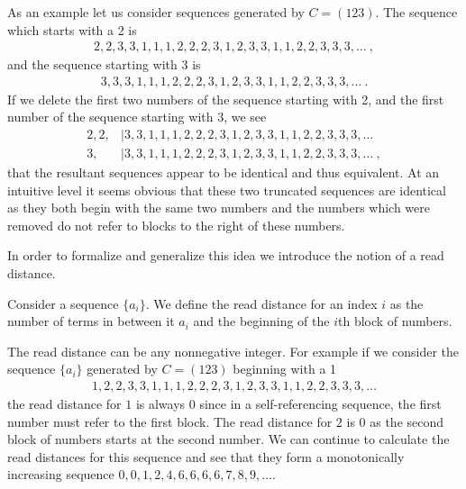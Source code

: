 \documentclass[runningheads,a4paper]{llncs}
\begin{document}
As an example let us consider sequences generated by $C = (123)$. The sequence which starts with a 2 is 
\begin{align*}
2,2,3,3,1,1,1,2,2,2,3,1,2,3,3,1,1,2,2,3,3,3,\dots \ ,
\end{align*}
and the sequence starting with 3 is 
\begin{align*}
3,3,3,1,1,1,2,2,2,3,1,2,3,3,1,1,2,2,3,3,3,\dots \ .
\end{align*}
If we delete the first two numbers of the sequence starting with 2, and the first number of the sequence starting with 3, we see 
\begin{align*}
2,2,&|3,3,1,1,1,2,2,2,3,1,2,3,3,1,1,2,2,3,3,3,\dots\\
3,&|3,3,1,1,1,2,2,2,3,1,2,3,3,1,1,2,2,3,3,3,\dots \ ,
\end{align*}
that the resultant sequences appear to be identical and thus equivalent. At an intuitive level it seems obvious that these two truncated sequences are identical as they both begin with the same two numbers and the numbers which were removed do not refer to blocks to the right of these numbers.   

In order to formalize and generalize this idea we introduce the notion of a read distance.  
\begin{definition} Consider a sequence $\{a_i\}$. We define the read distance for an index $i$ as the number of terms in between it $a_i$ and the beginning of the $i$th block of numbers.
\end{definition}
The read distance can be any nonnegative integer. For example if we consider the sequence $\{a_i\}$ generated by $C = (1 2 3)$ beginning with a 1  
\begin{align*}
1,2,2,3,3,1,1,1,2,2,2,3,1,2,3,3,1,1,2,2,3,3,3,\dots
\end{align*}
the read distance for $1$ is always $0$ since in a self-referencing sequence, the first number must refer to the first block. The read distance for $2$ is $0$ as the second block of numbers starts at the second number. We can continue to calculate the read distances for this sequence and see that they form a monotonically increasing sequence $0, 0 ,1,2,4,6,6,6,6,7,8,9,\ldots$. 
\end{document}
